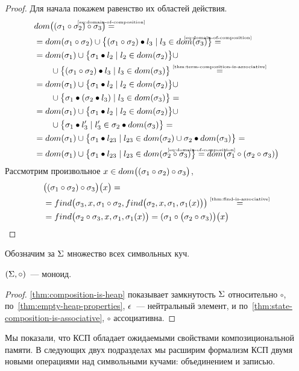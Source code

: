 \begin{proof}
Для начала покажем равенство их областей действия.
\begin{align*}
&\Dom{\compose{(\compose{\sigma_1}{\sigma_2})}{\sigma_3}}\eqbyref{eq:domain-of-composition}\\
&=\dom{\compose{\sigma_1}{\sigma_2}}\cup\big\{\fillterm{(\compose{\sigma_1}{\sigma_2})}{l_3} \mid l_3\in\dom{\sigma_3} \big\}\eqbyref{eq:domain-of-composition}\\
&= \dom{\sigma_1}\cup\big\{\fillterm{\sigma_1}{l_2} \mid l_2\in\dom{\sigma_2}\big\}\cup\\
&\qquad\cup\big\{\fillterm{(\compose{\sigma_1}{\sigma_2})}{l_3} \mid l_3\in\dom{\sigma_3}\big\}\eqby{\autoref{thm:term-composition-is-associative}}\\
&= \dom{\sigma_1}\cup\big\{\fillterm{\sigma_1}{l_2} \mid l_2\in\dom{\sigma_2}\big\}\cup\\
&\qquad\cup\big\{\fillterm{\sigma_1}{(\fillterm{\sigma_2}{l_3})} \mid l_3\in\dom{\sigma_3}\big\}=\\
&= \dom{\sigma_1}\cup\big\{\fillterm{\sigma_1}{l_2} \mid l_2\in\dom{\sigma_2}\big\}\cup\\
&\qquad\cup\big\{\fillterm{\sigma_1}{l_3'} \mid l_3'\in\fillterm{\sigma_2}{\dom{\sigma_3}}\big\}=\\
&= \dom{\sigma_1}\cup\big\{\fillterm{\sigma_1}{l_{23}} \mid l_{23}\in\dom{\sigma_2}\cup\fillterm{\sigma_2}{\dom{\sigma_3}}\big\}=\\
&= \dom{\sigma_1}\cup\big\{\fillterm{\sigma_1}{l_{23}} \mid l_{23}\in\dom{\compose{\sigma_2}{\sigma_3}}\big\}\eqbyref{eq:domain-of-composition}\Dom{\compose{\sigma_1}{(\compose{\sigma_2}{\sigma_3})}}
\end{align*}
%
Рассмотрим произвольное $x\in dom\big((\sigma_1\circ\sigma_2)\circ\sigma_3\big)$,
%
\begin{align*}\notag
&\big(\compose{(\compose{\sigma_1}{\sigma_2})}{\sigma_3}\big)\big(x\big)=\\
&=\finD{\sigma_3}{x}{\compose{\sigma_1}{\sigma_2}}{\finD{\sigma_2}{x}{\sigma_1}{\sigma_1(x)}}\eqby{\autoref{thm:find-is-associative}}\\
&=\finD{\compose{\sigma_2}{\sigma_3}}{x}{\sigma_1}{\sigma_1(x)}=(\compose{\sigma_1}{\big(\compose{\sigma_2}{\sigma_3})}\big)\big(x\big)
\end{align*}
\end{proof}
%
Обозначим за $\Sigma$ множество всех символьных куч.
%
\begin{thm}
$(\Sigma, \circ)$~--- моноид.
\end{thm}
\begin{proof}
\autoref{thm:composition-is-heap} показывает замкнутость $\Sigma$ относительно $\circ$, по~\autoref{thm:empty-heap-properties}, $\epsilon$~--- нейтральный элемент, и по~\autoref{thm:state-composition-is-associative}, $\circ$ ассоциативна.
\end{proof}
%
Мы показали, что КСП обладает ожидаемыми свойствами композициональной памяти. В следующих двух подразделах мы расширим формализм КСП двумя новыми операциями над символьными кучами: объединением и записью.

